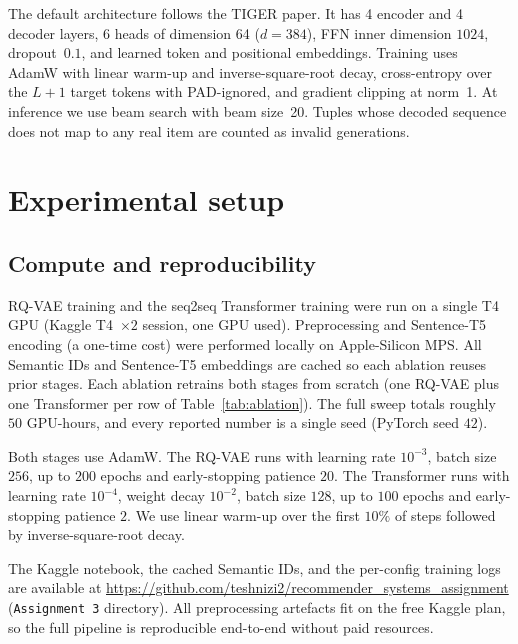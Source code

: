 \documentclass[sigconf]{acmart}
\begin{document}
The default architecture follows the TIGER paper.  It has 4 encoder
and 4 decoder layers, 6 heads of dimension 64 ($d{=}384$), FFN inner
dimension $1024$, dropout~$0.1$, and learned token and positional
embeddings.  Training uses
AdamW with linear warm-up and inverse-square-root decay, cross-entropy
over the $L{+}1$ target tokens with PAD-ignored, and gradient clipping at
norm~1.  At inference we use beam search with beam size~20. Tuples whose
decoded sequence does not map to any real item are counted as
invalid generations.

\section{Experimental setup}
\subsection{Compute and reproducibility}
\begin{sloppypar}
RQ-VAE training and the seq2seq Transformer training were run on a
single T4 GPU (Kaggle T4~$\times 2$ session, one GPU used).
Preprocessing and Sentence-T5 encoding (a one-time cost) were
performed locally on Apple-Silicon MPS.  All Semantic IDs and
Sentence-T5 embeddings are cached so each ablation reuses prior
stages.  Each ablation retrains both stages from scratch (one
RQ-VAE plus one Transformer per row of Table~\ref{tab:ablation}).
The full sweep totals roughly $50$ GPU-hours, and every reported
number is a single seed (PyTorch seed $42$).

Both stages use AdamW.  The RQ-VAE runs with learning rate
$10^{-3}$, batch size $256$, up to $200$ epochs and early-stopping
patience $20$.  The Transformer runs with learning rate $10^{-4}$,
weight decay $10^{-2}$, batch size $128$, up to $100$ epochs and
early-stopping patience $2$.  We use linear warm-up over the first
$10\%$ of steps followed by inverse-square-root decay.

The Kaggle notebook, the cached Semantic IDs, and the per-config
training logs are available at
\url{https://github.com/teshnizi2/recommender_systems_assignment}
(\texttt{Assignment 3} directory).  All preprocessing artefacts
fit on the free Kaggle plan, so the full pipeline is reproducible
end-to-end without paid resources.
\end{sloppypar}
\end{document}

